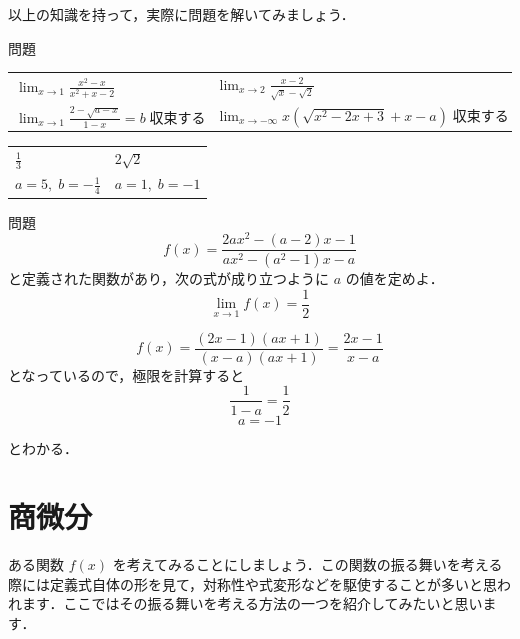 \documentclass[
  b4paperpaper,
  xelatex,ja=standard]{bxjsbook}
\begin{document}
以上の知識を持って，実際に問題を解いてみましょう．

\begin{Qbox}{問題}

\begin{longtable}[]{@{}
  >{\raggedright\arraybackslash}p{}
  >{\raggedright\arraybackslash}p{}@{}}
\toprule\noalign{}
\endhead
\bottomrule\noalign{}
\endlastfoot
\(\lim_{x\to 1}\frac{x^2-x}{x^2+x-2}\) &
\(\lim_{x\to 2}\frac{x-2}{\sqrt{x}-\sqrt{2}}\) \\
\(\lim_{x\to 1}\frac{2-\sqrt{a-x}}{1-x}=b\;\text{収束する}\) &
\(\lim_{x\to -\infty}x(\sqrt{x^2-2x+3}+x-a)\;\text{収束する}\) \\
\end{longtable}

\end{Qbox}


\begin{longtable}[]{@{}ll@{}}
\toprule\noalign{}
\endhead
\bottomrule\noalign{}
\endlastfoot
\(\frac{1}{3}\) & \(2\sqrt{2}\) \\
\(a=5,\;b=-\frac{1}{4}\) & \(a=1,\;b=-1\) \\
\end{longtable}

\begin{Qbox}{問題}
\[f(x)=\frac{2ax^2-(a-2)x-1}{ax^2-(a^2-1)x-a}\]
と定義された関数があり，次の式が成り立つように \(a\) の値を定めよ．
\[\lim_{x \to 1}f(x)=\frac{1}{2}\]

\end{Qbox}


\[f(x)=\frac{(2x-1)(ax+1)}{(x-a)(ax+1)}=\frac{2x-1}{x-a}\]
となっているので，極限を計算すると \[\frac{1}{1-a}=\frac{1}{2}\]
\[a=-1\]

とわかる．

\hypertarget{ux5546ux5faeux5206}{%
\section{商微分}\label{ux5546ux5faeux5206}}

ある関数 \(f(x)\)
を考えてみることにしましょう．この関数の振る舞いを考える際には定義式自体の形を見て，対称性や式変形などを駆使することが多いと思われます．ここではその振る舞いを考える方法の一つを紹介してみたいと思います．
\end{document}
